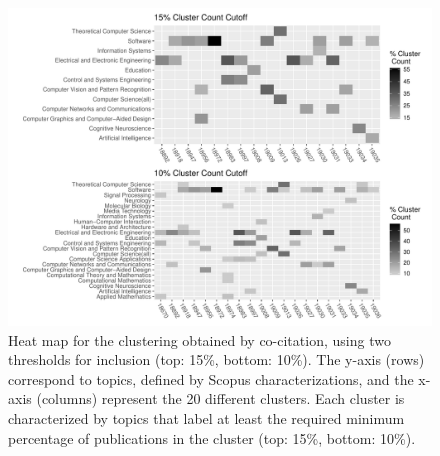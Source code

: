\begin{figure}[ht]
  \includegraphics[scale=0.45]{scopus_dblp_heatmap3.pdf}
\caption{Heat map for the clustering obtained by co-citation, using two thresholds for inclusion (top: 15\%, bottom: 10\%). The  y-axis (rows) correspond to topics, defined by Scopus characterizations, and the
x-axis (columns) represent the 20 different clusters.  
Each cluster is characterized by topics that label at least the required minimum percentage of publications in the cluster (top: 15\%, bottom: 10\%).   }
\label{fig:heatmap_cocit}       %
\end{figure}
\newpage

